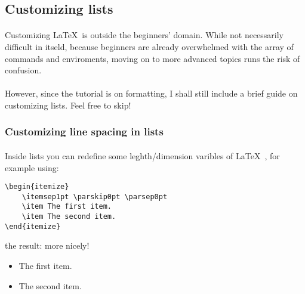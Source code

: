 \subsection{Customizing lists}
\paragraph{}
Customizing \LaTeX ~is outside the beginners' domain. While not necessarily
difficult in itseld, because beginners are already overwhelmed with the array
of commands and enviroments, moving on to more advanced topics runs the risk
of confusion.
\paragraph{}
However, since the tutorial is on formatting, I shall still include a brief
guide on customizing lists. Feel free to skip!

\subsubsection[Line spaces]{Customizing line spacing in lists}
\paragraph{}
Inside lists you can redefine some leghth/dimension varibles of \LaTeX~, for
example using:
\begin{verbatim}
\begin{itemize}
	\itemsep1pt \parskip0pt \parsep0pt
	\item The first item.
	\item The second item.
\end{itemize}
\end{verbatim}
the result: more nicely!
\begin{itemize}
	\itemsep1pt \parskip0pt 
	\item The first item.
	\item The second item.
\end{itemize}
